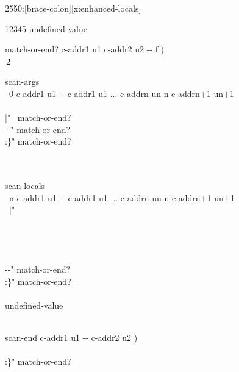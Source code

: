 \begin{worddef}[b:]{2550}{\brace:}[brace-colon][x:enhanced-locals]
	\begin{implement}
12345  undefined-value

\word{:} match-or-end?  c-addr1 u1 c-addr2 u2 -{}- f ) \\
\tab\,2        \word{;}

\word{:} scan-args \\
\tab\, 0 c-addr1 u1 -{}- c-addr1 u1 ... c-addrn un n c-addrn+1 un+1\\
\tab\, \\
\tab[2]	  |"   ~match-or-end?   \\
\tab[2]	  -{}-" match-or-end?   \\
\tab[2]	  :\}"  match-or-end?   \\
\tab[2]	   \\
\tab\,    \word{;}

\word{:} scan-locals \\
\tab\, n c-addr1 u1 -{}- c-addr1 u1 ... c-addrn un n c-addrn+1 un+1 \\
\tab\,  |"     \\
\tab[2]	 \\
\tab\, \\
\tab\,  \\
\tab\, \\
\tab[2]	  -{}-" match-or-end?   \\
\tab[2]	  :\}"  match-or-end?   \\
\tab[2]	   \\
\tab[2]	 undefined-value \\
\tab\,   \word{;}

\word{:} scan-end  c-addr1 u1 -{}- c-addr2 u2 ) \\
\tab\, \\
\tab[2]	  :\}" match-or-end?   \\
\tab[2]	  \\
\tab\, \word{;}


\end{implement}
\end{worddef}
